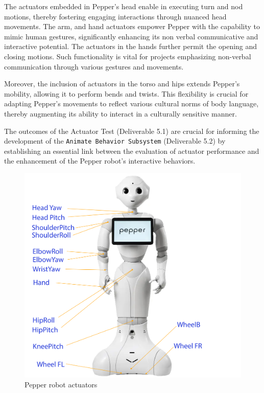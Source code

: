 \documentclass{CSSRforAfrica}
\begin{document}
The actuators embedded in Pepper's head enable in executing turn and nod motions, thereby fostering engaging interactions 
through nuanced head movements. The arm, and hand actuators empower Pepper with the capability to mimic human gestures, 
significantly enhancing its non verbal communicative and interactive potential. The actuators in the hands further 
permit the opening and closing motions. Such functionality is vital for projects emphasizing non-verbal communication 
through various gestures and movements.

Moreover, the inclusion of actuators in the torso and hips extends Pepper's mobility, allowing it to perform bends and twists. 
This flexibility is crucial for adapting Pepper's movements to reflect various cultural norms of body language, thereby 
augmenting its ability to interact in a culturally sensitive manner. 

The outcomes of the Actuator Test (Deliverable 5.1) are crucial for informing the development of the \texttt{Animate 
Behavior Subsystem} (Deliverable 5.2) by establishing an essential link between the evaluation of actuator performance and 
the enhancement of the Pepper robot's interactive behaviors. 

\begin{figure}[!hbpt]
\centering
\includegraphics[scale=0.115]{images/Pepper_actuator.png}
\caption{Pepper robot actuators}
\label{fig:Pepper_actuator}
\end{figure}
\end{document}
